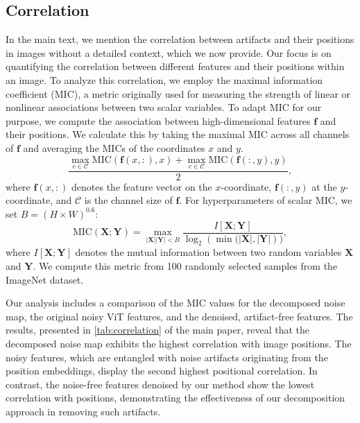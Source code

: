 \documentclass[runningheads]{llncs}
\begin{document}
\subsection{Correlation}
In the main text, we mention the correlation between artifacts and their positions in images without a detailed context, which we now provide. Our focus is on quantifying the correlation between different features and their positions within an image. To analyze this correlation, we employ the maximal information coefficient (MIC), a metric originally used for measuring the strength of linear or nonlinear associations between two scalar variables. To adapt MIC for our purpose, we compute the association between high-dimensional features $\mathbf{f}$ and their positions. We calculate this by taking the maximal MIC across all channels of $\mathbf{f}$ and averaging the MICs of the coordinates $x$ and $y$.
\begin{equation}
    \frac{\max_{c \in \mathcal{C}}{\text{MIC}(\mathbf{f}(x, :), x)} + \max_{c \in \mathcal{C}}{\text{MIC}(\mathbf{f}(:, y), y)}}{2},
\end{equation}
where $\mathbf{f}(x, :)$ denotes the feature vector on the $x$-coordinate, $\mathbf{f}(:, y)$ at the $y$-coordinate, and $\mathcal{C}$ is the channel size of $\mathbf{f}$. For hyperparameters of scalar MIC, we set $B=(H \times W)^{0.6}$:
\begin{equation}
    \text{MIC}(\mathbf{X}; \mathbf{Y}) = \max_{|\mathbf{X}| |\mathbf{Y}| < B} \frac{I[\mathbf{X}; \mathbf{Y}]}{\log_2{(\min{(|\mathbf{X}|, |\mathbf{Y}|}))}},
\end{equation}
where $I[\mathbf{X}; \mathbf{Y}]$ denotes the mutual information between two random variables $\mathbf{X}$ and $\mathbf{Y}$. We compute this metric from 100 randomly selected samples from the ImageNet dataset.

Our analysis includes a comparison of the MIC values for the decomposed noise map, the original noisy ViT features, and the denoised, artifact-free features. The results, presented in \cref{tab:correlation} of the main paper, reveal that the decomposed noise map exhibits the highest correlation with image positions. The noisy features, which are entangled with noise artifacts originating from the position embeddings, display the second highest positional correlation. In contrast, the noise-free features denoised by our method show the lowest correlation with positions, demonstrating the effectiveness of our decomposition approach in removing such artifacts.
\end{document}
